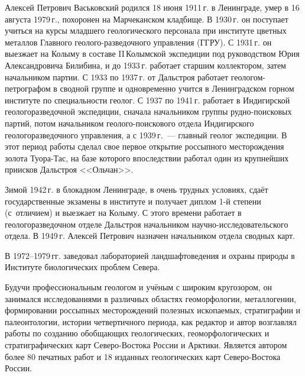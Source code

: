 



\makeProcTitleII
{}


Алексей Петрович Васьковский родился 18 июня 1911\,г. в Ленинграде, умер в 16 августа 1979\,г., похоронен на Марчеканском кладбище. В 1930\,г. он поступает учиться на курсы младшего геологического персонала при институте цветных металлов Главного геолого-разведочного управления \mbox{(ГГРУ)}. С 1931\,г. он выезжает на Колыму в составе II\,Колымской экспедиции под руководством Юрия Александровича Билибина, и до 1933\,г. работает старшим коллектором, затем начальником партии. С 1933 по 1937\,г. от Дальстроя работает геологом-петрографом в сводной группе и одновременно учится в Ленинградском горном институте по специальности геолог. С 1937 по 1941\,г. работает в Индигирской геологоразведочной экспедиции, сначала начальником группы рудно-поисковых партий, потом начальником геолого-поискового отдела Индигирского геологоразведочного управления, а с 1939\,г.~--- главный геолог экспедиции. В этот период работы сделал свое первое открытие россыпного месторождения золота Туора-Тас, на базе которого впоследствии работал один из крупнейших приисков Дальстроя <<Ольчан>>.

Зимой 1942\,г. в блокадном Ленинграде, в очень трудных условиях, сдаёт государственные экзамены в институте и получает диплом 1-й степени (с~отличием) и выезжает на Колыму. С этого времени работает в геологоразведочном отделе Дальстроя начальником научно-исследовательского отдела. В 1949\,г. Алексей Петрович назначен начальником отдела сводных карт.%

В 1972--1979\,гг. заведовал лабораторией ландшафтоведения и охраны природы в Институте биологических проблем Севера.

Будучи профессиональным геологом и учёным с широким кругозором, он занимался исследованиями в различных областях геоморфологии, металлогении, формировании россыпных месторождений полезных ископаемых, стратиграфии и палеонтологии, истории четвертичного периода, как редактор и автор возглавлял работы по созданию обобщающих геологических, геоморфологических и стратиграфических карт Северо-Востока России и Арктики. Является автором более 80 печатных работ и 18 изданных геологических карт Северо-Востока России.

